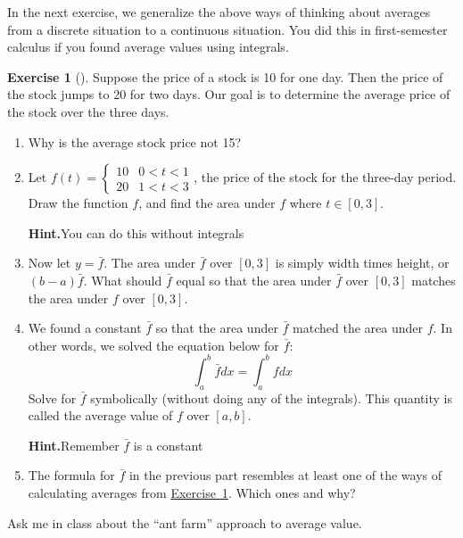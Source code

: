 \documentclass[10pt,]{book}
\theoremstyle{plain}
\theoremstyle{definition}
\theoremstyle{definition}
\theoremstyle{definition}
\theoremstyle{definition}
\newtheorem{exploration}[project]{Exercise}
\theoremstyle{definition}
\numberwithin{equation}{section}
\newcommand{\lt}{<}
\newcommand{\amp}{&}
\begin{document}
In the next exercise, we generalize the above ways of thinking about averages from a discrete situation to a continuous situation. You did this in first-semester calculus if you found average values using integrals.%
\begin{exploration}[]\label{exploration-211}
Suppose the price of a stock is \textdollar{}10 for one day. Then the price of the stock jumps to \textdollar{}20 for two days. Our goal is to determine the average price of the stock over the three days.%
\begin{enumerate}[font=\bfseries,label=(\alph*),ref=\alph*]
\item\label{task-545} Why is the average stock price not \textdollar{}15?%
\item\label{task-546} Let \(f(t) = \begin{cases}10 \amp 0\lt t\lt 1\\20\amp 1\lt t\lt 3
\end{cases}\), the price of the stock for the three-day period. Draw the function \(f\), and find the area under \(f\) where \(t\in[0,3]\).%
\par\medskip\noindent%
\textbf{Hint.}\quad You can do this without integrals%
\item\label{task-547} Now let \(y=\bar f\).  The area under \(\bar f\) over \([0,3]\) is simply width times height, or \((b-a)\bar f\). What should \(\bar f\) equal so that the area under \(\bar f\) over \([0,3]\) matches the area under \(f\) over \([0,3]\).%
\item\label{task-548} We found a constant \(\bar f\) so that the area under \(\bar f\) matched the area under \(f\). In other words, we solved the equation below for \(\bar f\):%
\begin{equation*}
\int_a^b \bar f dx = \int_a^b f dx
\end{equation*}
Solve for \(\bar f\) symbolically (without doing any of the integrals). This quantity is called the average value of \(f\) over \([a,b]\).%
\par\medskip\noindent%
\textbf{Hint.}\quad Remember \(\bar{f}\) is a constant%
\item\label{task-549} The formula for \(\bar f\) in the previous part resembles at least one of the ways of calculating averages from \hyperref[average_value_methods]{Exercise~1}.  Which ones and why?%
\end{enumerate}
\end{exploration}
Ask me in class about the ``ant farm'' approach to average value.%
\end{document}
